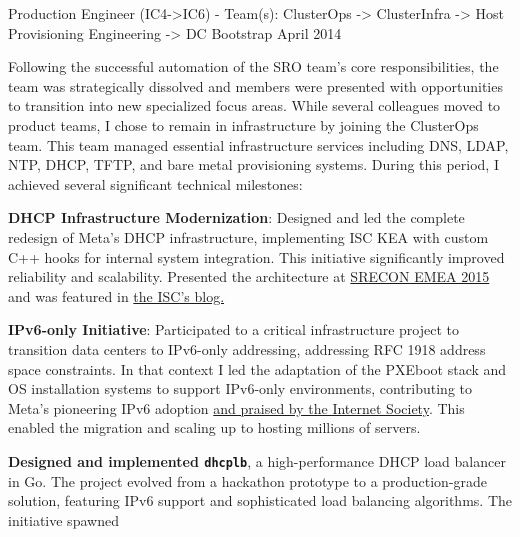 \begin{cventries}
  \cventryprevrole
  {Production Engineer (IC4->IC6) - Team(s): ClusterOps -> ClusterInfra -> Host Provisioning Engineering -> DC Bootstrap}
  {April 2014 }
  {
    Following the successful automation of the SRO team's core responsibilities, the team was strategically dissolved and
    members were presented with opportunities to transition into new specialized focus areas.
    While several colleagues moved to product teams, I chose to remain in infrastructure by joining the ClusterOps team.
    This team managed essential infrastructure services including DNS, LDAP, NTP, DHCP, TFTP, and bare metal provisioning systems.
    \newline
    During this period, I achieved several significant technical milestones:
    \vspace{2mm}
    \begin{cvitems}
      \item {\textbf{DHCP Infrastructure Modernization}: Designed and led the complete redesign of Meta's DHCP infrastructure,
                  implementing ISC KEA with custom C++ hooks for internal system integration. This initiative
                  significantly improved reliability and scalability. Presented the architecture at \href{https://www.usenix.org/conference/srecon15europe/program/presentation/failla}{SRECON EMEA 2015}
                  and was featured in \href{https://www.isc.org/blogs/how-facebook-is-using-kea-in-the-datacenter/}{the ISC's blog.}}
      \item {\textbf{IPv6-only Initiative}: Participated to a critical infrastructure project to transition
                  data centers to IPv6-only addressing, addressing RFC 1918 address space constraints. In that context I led the
                  adaptation of the PXEboot stack and OS installation systems to support IPv6-only environments, contributing
                  to Meta's pioneering IPv6 adoption \href{https://www.internetsociety.org/resources/deploy360/2014/case-study-facebook-moving-to-an-ipv6-only-internal-network/}{and praised by the Internet Society}.
                  This enabled the migration and scaling up to hosting millions of servers.}
      \item {\textbf{Designed and implemented \texttt{dhcplb}}, a high-performance
                  DHCP load balancer in Go. The project evolved from a hackathon prototype to a production-grade
                  solution, featuring IPv6 support and sophisticated load balancing algorithms. The initiative spawned
}
\end{cvitems}}
\end{cventries}
